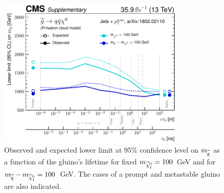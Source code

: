 \begin{figure}
\includegraphics[width=0.8\textwidth]{figs/results/limits_ra1}
\caption{Observed and expected lower limit at 95\% confidence level on $m_{\mathrm{\widetilde{g}}}$ 
as a function of the gluino's lifetime for fixed $m_{\widetilde{\chi}_1^0}=100$~GeV and for $m_{\mathrm{\widetilde{g}}} 
- m_{\widetilde{\chi}_1^0} = 100$~GeV. The cases of a prompt and metastable gluino are also 
indicated.}
\label{fig:limits-vsctau}
\end{figure}

